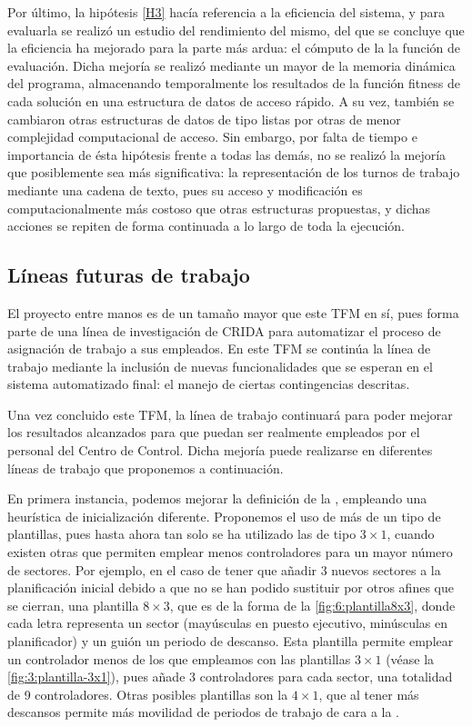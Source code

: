 Por último, la hipótesis \ref{H3} hacía referencia a la eficiencia del sistema, y para evaluarla se realizó un estudio del rendimiento del mismo, del que se concluye que la eficiencia ha mejorado para la parte más ardua: el cómputo de la la función de evaluación. Dicha mejoría se realizó mediante un mayor de la memoria dinámica del programa, almacenando temporalmente los resultados de la función fitness de cada solución en una estructura de datos de acceso rápido. A su vez, también se cambiaron otras estructuras de datos de tipo listas por otras de menor complejidad computacional de acceso. Sin embargo, por falta de tiempo e importancia de ésta hipótesis frente a todas las demás, no se realizó la mejoría que posiblemente sea más significativa: la representación de los turnos de trabajo mediante una cadena de texto, pues su acceso y modificación es computacionalmente más costoso que otras estructuras propuestas, y dichas acciones se repiten de forma continuada a lo largo de toda la ejecución.

\subsection{Líneas futuras de trabajo}

El proyecto entre manos es de un tamaño mayor que este TFM en sí, pues forma parte de una línea de investigación de \gls{CRIDA} para automatizar el proceso de asignación de trabajo a sus empleados. En este TFM se continúa la línea de trabajo mediante la inclusión de nuevas funcionalidades que se esperan en el sistema automatizado final: el manejo de ciertas contingencias descritas.

Una vez concluido este TFM, la línea de trabajo continuará para poder mejorar los resultados alcanzados para que puedan ser realmente empleados por el personal del Centro de Control. Dicha mejoría puede realizarse en diferentes líneas de trabajo que proponemos a continuación.

En primera instancia, podemos mejorar la definición de la \faseuno{}, empleando una heurística de inicialización diferente. Proponemos el uso de más de un tipo de plantillas, pues hasta ahora tan solo se ha utilizado las de tipo $3\times1$, cuando existen otras que permiten emplear menos controladores para un mayor número de sectores. Por ejemplo, en el caso de tener que añadir 3 nuevos sectores a la planificación inicial debido a que no se han podido sustituir por otros afines que se cierran, una plantilla $8\times3$, que es de la forma de la \autoref{fig:6:plantilla8x3}, donde cada letra representa un sector (mayúsculas en puesto ejecutivo, minúsculas en planificador) y un guión un periodo de descanso. Esta plantilla permite emplear un controlador menos de los que empleamos con las plantillas $3\times1$ (véase la \autoref{fig:3:plantilla-3x1}), pues añade 3 controladores para cada sector, una totalidad de 9 controladores. Otras posibles plantillas son la $4\times1$, que al tener más descansos permite más movilidad de periodos de trabajo de cara a la \fasedos{}. %

